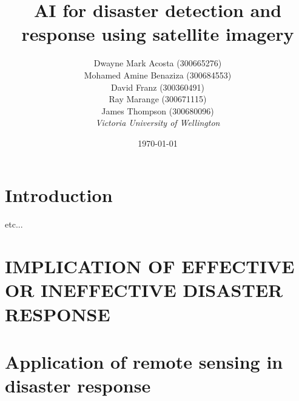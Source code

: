 \documentclass[conference,a4paper]{IEEEtran}
\begin{document}
\newcommand{\cfigure}[2]{%
  \begin{figure}[h]
    \centering
    \texttt{[image: figures/\#1.png]}%
    \caption{#2}%
    \label{fig:#1}%
  \end{figure}%

}
\title{AI for disaster detection and response using satellite imagery}

\author{Dwayne Mark Acosta (300665276) \\ Mohamed Amine Benaziza (300684553) \\ David Franz (300360491) \\ Ray Marange (300671115) \\ James Thompson (300680096)\\
\textit{Victoria University of Wellington}\\}
\date{\today}

\maketitle

\section{Introduction}


\cite{elbohy2025fusion} etc...


\section{IMPLICATION OF EFFECTIVE OR INEFFECTIVE DISASTER RESPONSE}


\section{Application of remote sensing in disaster response}

\end{document}
